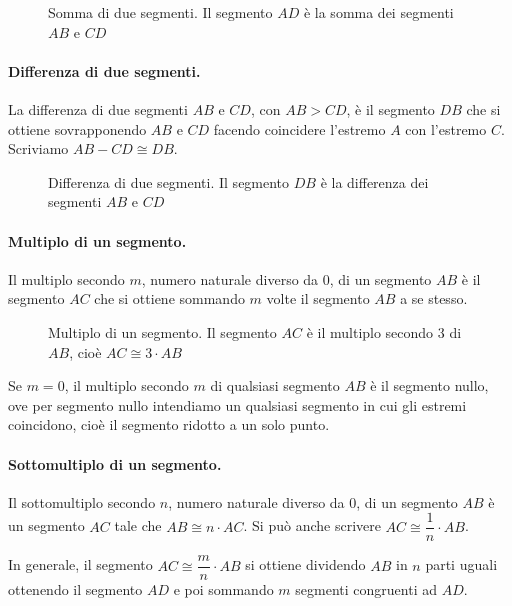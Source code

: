 \begin{figure}[htb]
\centering
\caption{Somma di due segmenti. Il segmento $AD$ è la somma dei segmenti $AB$ e $CD$}
\end{figure}

\paragraph{Differenza di due segmenti.} La differenza di due segmenti $AB$ e $CD$, con $AB>CD$, è il segmento $DB$ che si ottiene sovrapponendo $AB$ e $CD$ facendo coincidere l'estremo $A$ con l'estremo $C$. Scriviamo $AB-CD \cong DB$.

\begin{figure}[htb]
\centering
\caption{Differenza di due segmenti. Il segmento $DB$ è la differenza dei segmenti $AB$ e $CD$}
\end{figure}

\paragraph{Multiplo di un segmento.} Il multiplo secondo $m$, numero naturale diverso da 0, di un segmento $AB$ è il segmento $AC$ che si ottiene sommando $m$ volte il segmento $AB$ a se stesso.

\begin{figure}[htb]
\centering
\caption{Multiplo di un segmento. Il segmento $AC$ è il multiplo secondo 3 di $AB$, cioè $AC\cong 3\cdot AB$}
\end{figure}

Se $m=0$, il multiplo secondo $m$ di qualsiasi segmento $AB$ è il segmento nullo, ove per segmento nullo intendiamo un qualsiasi segmento in cui gli estremi coincidono, cioè il segmento ridotto a un solo punto.

\paragraph{Sottomultiplo di un segmento.} Il sottomultiplo secondo $n$, numero naturale diverso da 0, di un segmento $AB$ è un segmento $AC$ tale che $AB\cong n\cdot AC$. Si può anche scrivere $AC \cong \dfrac{1}{n}\cdot AB$.

In generale, il segmento $AC\cong\dfrac{m}{n}\cdot AB$ si ottiene dividendo $AB$ in $n$ parti uguali ottenendo il segmento $AD$ e poi sommando $m$ segmenti congruenti ad $AD$.

